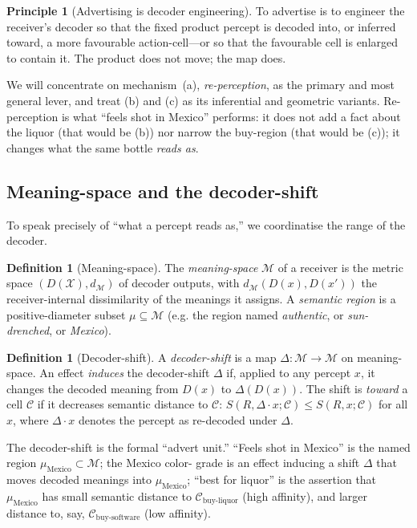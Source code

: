 \documentclass[twocolumn,11pt,a4paper]{article}
\theoremstyle{adv}
\theoremstyle{definition}
\newtheorem{definition}[theorem]{Definition}
\newtheorem{principle}[theorem]{Principle}
\theoremstyle{remark}
\newcommand{\Out}{\mathcal{X}}         %
\newcommand{\Cell}{\mathcal{C}}        %
\newcommand{\Dec}{D}                   %
\newcommand{\Recv}{R}                  %
\newcommand{\Sval}{S}                  %
\newcommand{\Mean}{\mathcal{M}}        %
\newcommand{\shift}{\Delta}            %
\newcommand{\dist}{d}
\begin{document}
\begin{principle}[Advertising is decoder engineering]
\label{prin:engineering}
To advertise is to engineer the receiver's decoder so that the fixed
product percept is decoded into, or inferred toward, a more favourable
action-cell---or so that the favourable cell is enlarged to contain it.
The product does not move; the map does.
\end{principle}

We will concentrate on mechanism~(a), \emph{re-perception}, as the primary
and most general lever, and treat (b) and (c) as its inferential and
geometric variants. Re-perception is what ``feels shot in Mexico''
performs: it does not add a fact about the liquor (that would be (b)) nor
narrow the buy-region (that would be (c)); it changes what the same bottle
\emph{reads as}.

\subsection{Meaning-space and the decoder-shift}

To speak precisely of ``what a percept reads as,'' we coordinatise the
range of the decoder.

\begin{definition}[Meaning-space]
\label{def:meaning}
The \emph{meaning-space} $\Mean$ of a receiver is the metric space
$(\Dec(\Out),\dist_{\Mean})$ of decoder outputs, with
$\dist_{\Mean}(\Dec(x),\Dec(x'))$ the receiver-internal dissimilarity of
the meanings it assigns. A \emph{semantic region} is a positive-diameter
subset $\mu\subseteq\Mean$ (e.g. the region named \emph{authentic},
or \emph{sun-drenched}, or \emph{Mexico}).
\end{definition}

\begin{definition}[Decoder-shift]
\label{def:shift}
A \emph{decoder-shift} is a map $\shift:\Mean\to\Mean$ on meaning-space. An
effect \emph{induces} the decoder-shift $\shift$ if, applied to any percept
$x$, it changes the decoded meaning from $\Dec(x)$ to
$\shift(\Dec(x))$. The shift is \emph{toward} a cell $\Cell$ if it
decreases semantic distance to $\Cell$:
$\Sval(\Recv,\shift\!\cdot x;\Cell)\le \Sval(\Recv,x;\Cell)$ for all $x$,
where $\shift\!\cdot x$ denotes the percept as re-decoded under $\shift$.
\end{definition}

The decoder-shift is the formal ``advert unit.'' ``Feels shot in Mexico''
is the named region $\mu_{\text{Mexico}}\subset\Mean$; the Mexico color-
grade is an effect inducing a shift $\shift$ that moves decoded meanings
into $\mu_{\text{Mexico}}$; ``best for liquor'' is the assertion that
$\mu_{\text{Mexico}}$ has small semantic distance to
$\Cell_{\text{buy-liquor}}$ (high affinity), and larger distance to,
say, $\Cell_{\text{buy-software}}$ (low affinity).
\end{document}
